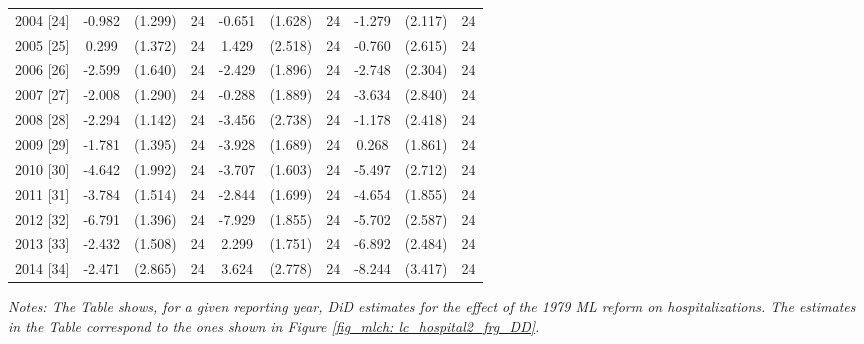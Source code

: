 \begin{table}[H]
\begin{threeparttable}
{\begin{tabular}{l*{9}{c}}
				2004 [24]           &      -0.982         &     (1.299)	& 24	&      -0.651         &     (1.628)		& 24	&      -1.279         &     (2.117)		& 24\\
				2005 [25]           &       0.299         &     (1.372)	& 24	&       1.429         &     (2.518)		& 24	&      -0.760         &     (2.615)		& 24\\
				2006 [26]           &      -2.599         &     (1.640)	& 24	&      -2.429         &     (1.896)		& 24	&      -2.748         &     (2.304)		& 24\\
				2007 [27]           &      -2.008         &     (1.290)	& 24	&      -0.288         &     (1.889)		& 24	&      -3.634         &     (2.840)		& 24\\
				2008 [28]           &      -2.294\sym{*}  &     (1.142)	& 24	&      -3.456         &     (2.738)		& 24	&      -1.178         &     (2.418)		& 24\\
				2009 [29]           &      -1.781         &     (1.395)	& 24	&      -3.928\sym{**} &     (1.689)		& 24	&       0.268         &     (1.861)		& 24\\
				2010 [30]           &      -4.642\sym{**} &     (1.992)	& 24	&      -3.707\sym{**} &     (1.603)		& 24	&      -5.497\sym{*}  &     (2.712)		& 24\\
				2011 [31]           &      -3.784\sym{**} &     (1.514)	& 24	&      -2.844         &     (1.699)		& 24	&      -4.654\sym{**} &     (1.855)		& 24\\
				2012 [32]           &      -6.791\sym{***}&     (1.396)	& 24	&      -7.929\sym{***}&     (1.855)		& 24	&      -5.702\sym{**} &     (2.587)		& 24\\
				2013 [33]           &      -2.432         &     (1.508)	& 24	&       2.299         &     (1.751)		& 24	&      -6.892\sym{**} &     (2.484)		& 24\\
				2014 [34]           &      -2.471         &     (2.865)	& 24	&       3.624         &     (2.778)		& 24	&      -8.244\sym{**} &     (3.417)		& 24\\
				\bottomrule 
		\end{tabular}}
		\begin{tablenotes} 
			\item \scriptsize \emph{Notes: The Table shows, for a given reporting year, DiD estimates for the effect of the 1979 ML reform on hospitalizations. The estimates in the Table correspond to the ones shown in Figure \ref{fig_mlch: lc_hospital2_frg_DD}.} 
		\end{tablenotes} 
	\end{threeparttable} 
\end{table}